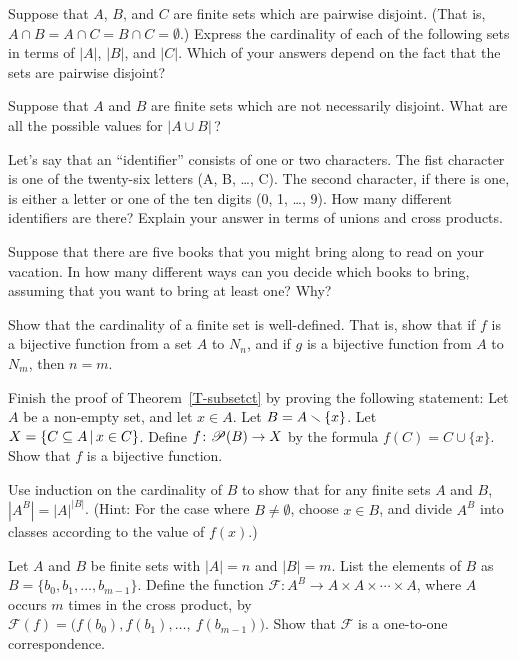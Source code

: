 \begin{exercises}

\problem Suppose that $A$, $B$, and $C$ are finite sets which are
pairwise disjoint.  (That is, $A\cap B=A\cap C=B\cap C=\emptyset$.)
Express the cardinality of each of the following sets in terms
of $|A|$, $|B|$, and $|C|$.  Which of your answers depend on
the fact that the sets are pairwise disjoint?

\problem Suppose that $A$ and $B$ are finite sets which are not necessarily
disjoint.  What are all the possible values for $|A\cup B|\,$?

\problem Let's say that an ``identifier'' consists of one or two
characters.  The fist character is one of the twenty-six letters
(A, B, \dots, C). The second character, if there is one, is either a letter or
one of the ten digits (0, 1, \dots, 9).  How many different identifiers
are there?   Explain your answer in terms of unions and cross products.

\problem Suppose that there are five books that you might bring along to
read on your vacation.  In how many different ways can you decide which
books to bring, assuming that you want to bring at least one?  Why?

\problem Show that the cardinality of a finite set is well-defined.
That is, show that if $f$ is a bijective function from a set $A$ to
$N_n$, and if $g$ is a bijective function from $A$ to $N_m$, then
$n=m$.

\problem Finish the proof of Theorem~\ref{T-subsetct} by proving the
following statement:  Let $A$ be a non-empty set, and let $x\in A$.  
Let $B=A\smallsetminus\{x\}$.
Let $X=\{C\subseteq A\,|\, x\in C\}$.  Define $f\colon{\mathscr P}(B)\to X$
by the formula $f(C)=C\cup\{x\}$.  Show that $f$ is a bijective
function.

\problem Use induction on the cardinality of $B$ to show that for
any finite sets $A$ and $B$, $\left|A^B\right|=|A|^{|B|}$.
(Hint:  For the case where $B\not=\emptyset$, choose $x\in B$,
and divide $A^B$ into classes according to the value of $f(x)$.)

\problem Let $A$ and $B$ be finite sets with $|A|=n$ and $|B|=m$.
List the elements of $B$ as $B=\{b_0,b_1,\dots,b_{m-1}\}$.
Define the function ${\mathscr F}\colon A^B\to A\times A\times\cdots\times A$,
where $A$ occurs $m$ times in the cross product, by
${\mathscr F}(f)=\big(f(b_0), f(b_1), \dots,~f(b_{m-1})\big)$.
Show that ${\mathscr F}$ is a one-to-one correspondence.


\end{exercises}

